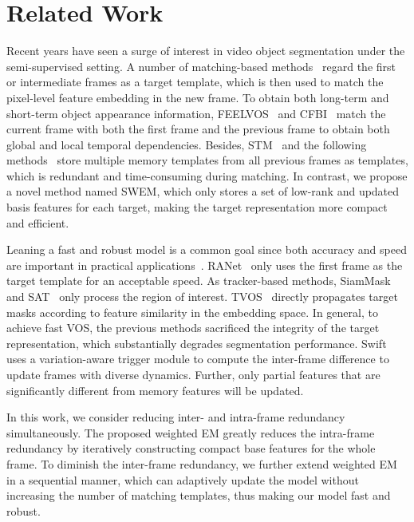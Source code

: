 \section{Related Work}
Recent years have seen a surge of interest in video object segmentation under the semi-supervised setting.  A number of matching-based methods~\cite{wang2019fast,hu2018videomatch,chen2018blazingly,Wang_2019_ICCV,Oh_2019_ICCV,seong_2020_ECCV,lu_2020_ECCV,liang2020video, hu2021learning,xie2021efficient,wang2021swiftnet,seong2021hierarchical,cheng2021stcn} regard the first or intermediate frames as a target template, which is then used to match the pixel-level feature embedding in the new frame. To obtain both long-term and short-term object appearance information, FEELVOS~\cite{Voigtlaender_2019_CVPR} and CFBI~\cite{yang_2020_ECCV} match the current frame with both the first frame and the previous frame to obtain both global and local temporal dependencies. Besides, STM~\cite{Oh_2019_ICCV} and the following methods~\cite{seong_2020_ECCV, hu2021learning,xie2021efficient,seong2021hierarchical,cheng2021stcn} store multiple memory templates from all previous frames as templates, which is redundant and time-consuming during matching. In contrast, we propose a novel method named SWEM, which only stores a set of low-rank and updated basis features for each target, making the target representation more compact and efficient. 
 
Leaning a fast and robust model is a common goal since both accuracy and speed are important in practical applications~\cite{Wang_2019_ICCV,wang2019fast,Robinson_2020_CVPR,Chen_2020_CVPR,Zhang_2020_CVPR,li_2020_ECCV_GCM}. RANet~\cite{Wang_2019_ICCV} only uses the first frame as the target template for an acceptable speed. As tracker-based methods, SiamMask~\cite{wang2019fast} and SAT~\cite{Chen_2020_CVPR} only process the region of interest. TVOS~\cite{Zhang_2020_CVPR} directly propagates target masks according to feature similarity in the embedding space. In general, to achieve fast VOS, the previous methods sacrificed the integrity of the target representation, which substantially degrades segmentation performance. Swift~\cite{wang2021swiftnet} uses a variation-aware trigger module to compute the inter-frame difference to update frames with diverse dynamics. Further, only partial features that are significantly different from memory features will be updated. 

In this work, we consider reducing inter- and intra-frame redundancy simultaneously. The proposed weighted EM greatly reduces the intra-frame redundancy by iteratively constructing compact base features for the whole frame. To diminish the inter-frame redundancy, we further extend weighted EM in a sequential manner,
which can adaptively update the model without increasing the number of matching templates, thus making our model fast and robust.        

